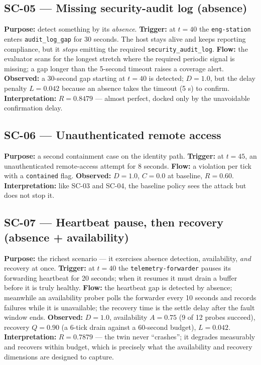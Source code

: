 \documentclass[11pt]{article}
\newcommand{\code}[1]{\texttt{\small #1}}
\begin{document}
\subsection{SC-05 --- Missing security-audit log (absence)}
\textbf{Purpose:} detect something by its \emph{absence}. \textbf{Trigger:} at
$t=40$ the \code{eng-station} enters \code{audit\_log\_gap} for 30 seconds. The
host stays alive and keeps reporting compliance, but it \emph{stops} emitting the
required \code{security\_audit\_log}. \textbf{Flow:} the evaluator scans for the
longest stretch where the required periodic signal is missing; a gap longer than
the 5-second timeout raises a coverage alert. \textbf{Observed:} a 30-second gap
starting at $t=40$ is detected; $D=1.0$, but the delay penalty $L=0.042$ because
an absence takes the timeout (5 s) to confirm. \textbf{Interpretation:} $R=0.8479$
--- almost perfect, docked only by the unavoidable confirmation delay.

\subsection{SC-06 --- Unauthenticated remote access}
\textbf{Purpose:} a second containment case on the identity path. \textbf{Trigger:}
at $t=45$, an unauthenticated remote-access attempt for 8 seconds. \textbf{Flow:}
a violation per tick with a \code{contained} flag. \textbf{Observed:} $D=1.0$,
$C=0.0$ at baseline, $R=0.60$. \textbf{Interpretation:} like SC-03 and SC-04, the
baseline policy sees the attack but does not stop it.

\subsection{SC-07 --- Heartbeat pause, then recovery (absence + availability)}
\textbf{Purpose:} the richest scenario --- it exercises absence detection,
availability, \emph{and} recovery at once. \textbf{Trigger:} at $t=40$ the
\code{telemetry-forwarder} pauses its forwarding heartbeat for 20 seconds; when it
resumes it must drain a buffer before it is truly healthy. \textbf{Flow:} the
heartbeat gap is detected by absence; meanwhile an availability prober polls the
forwarder every 10 seconds and records failures while it is unavailable; the
recovery time is the settle delay after the fault window ends. \textbf{Observed:}
$D=1.0$, availability $A=0.75$ (9 of 12 probes succeed), recovery $Q=0.90$
(a 6-tick drain against a 60-second budget), $L=0.042$. \textbf{Interpretation:}
$R=0.7879$ --- the twin never ``crashes''; it degrades measurably and recovers
within budget, which is precisely what the availability and recovery dimensions
are designed to capture.
\end{document}
